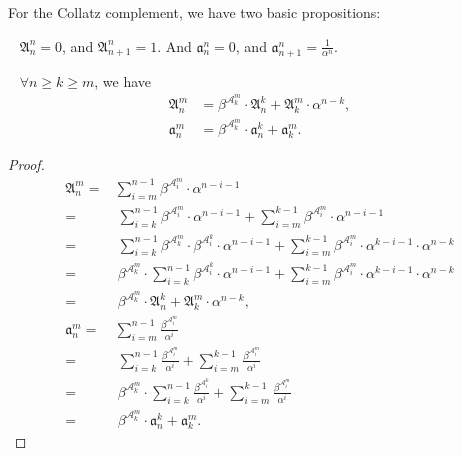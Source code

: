 For the Collatz complement, we have two basic propositions:
\begin{proposition}~\label{proposition:collatz-complement-basic-prop1}
$\mathfrak{A}_{n}^{n} = 0$, and $\mathfrak{A}_{n+1}^{n} = 1$.
And $\mathfrak{a}_{n}^{n} = 0$, and $\mathfrak{a}_{n+1}^{n} = \frac{1}{\alpha^{n}}$.
\end{proposition}
\begin{proposition}~\label{proposition:collatz-complement-basic-prop2}
    $\forall n \ge k \ge m$, we have
    \begin{align*}
        \mathfrak{A}_n^{m} &= \beta^{\mathcal{A}_k^{m}}\cdot\mathfrak{A}_n^{k} + \mathfrak{A}_k^m\cdot\alpha^{n-k}, \\
        \mathfrak{a}_n^{m} &= \beta^{\mathcal{A}_k^{m}}\cdot\mathfrak{a}_n^{k} + \mathfrak{a}_k^m. 
    \end{align*}
\end{proposition}
\begin{proof}
\begin{align*}
    \mathfrak{A}_n^{m} =&\sum_{i = m}^{n - 1}\beta^{\mathcal{A}_i^{m}}\cdot\alpha^{n-i-1} \\
    =&\ \sum_{i = k}^{n - 1}\beta^{\mathcal{A}_i^{m}}\cdot\alpha^{n-i-1} + \sum_{i = m}^{k - 1}\beta^{\mathcal{A}_i^{m}}\cdot\alpha^{n-i-1} \\
    =&\ \sum_{i = k}^{n - 1}\beta^{\mathcal{A}_k^{m}}\cdot\beta^{\mathcal{A}_i^{k}}\cdot\alpha^{n-i-1} + \sum_{i = m}^{k - 1}\beta^{\mathcal{A}_i^{m}}\cdot\alpha^{k-i-1}\cdot\alpha^{n-k} \\
    =&\ \beta^{\mathcal{A}_k^{m}}\cdot\sum_{i = k}^{n - 1}\beta^{\mathcal{A}_i^{k}}\cdot\alpha^{n-i-1} + \sum_{i = m}^{k - 1}\beta^{\mathcal{A}_i^{m}}\cdot\alpha^{k-i-1}\cdot\alpha^{n-k} \\
    =&\ \beta^{\mathcal{A}_k^{m}}\cdot\mathfrak{A}_n^{k} + \mathfrak{A}_k^m\cdot\alpha^{n-k}, \\
    \mathfrak{a}_n^{m} =&\sum_{i = m}^{n - 1}\frac{\beta^{\mathcal{A}_i^{m}}}{\alpha^{i}} \\
    =&\ \sum_{i = k}^{n - 1}\frac{\beta^{\mathcal{A}_i^{m}}}{\alpha^{i}} + \sum_{i = m}^{k - 1}\frac{\beta^{\mathcal{A}_i^{m}}}{\alpha^{i}} \\
    =&\ \beta^{\mathcal{A}_k^{m}}\cdot\sum_{i = k}^{n - 1}\frac{\beta^{\mathcal{A}_i^{k}}}{\alpha^{i}} + \sum_{i = m}^{k - 1}\frac{\beta^{\mathcal{A}_i^{m}}}{\alpha^{i}} \\
    =&\ \beta^{\mathcal{A}_k^{m}}\cdot\mathfrak{a}_n^k + \mathfrak{a}_k^m.
\end{align*}
\end{proof}

